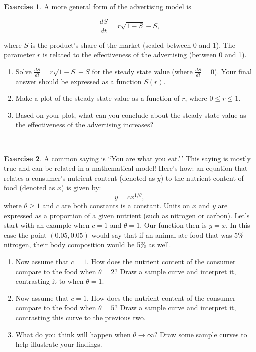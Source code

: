 \documentclass[
]{book}
\theoremstyle{definition}
\theoremstyle{definition}
\theoremstyle{definition}
\newtheorem{exercise}{Exercise}[chapter]
\theoremstyle{remark}
\begin{document}
\begin{exercise}
\protect\hypertarget{exr:unnamed-chunk-7}{}{\label{exr:unnamed-chunk-7} }A more general form of the advertising model is

\begin{equation}
\frac{dS}{dt} = r\sqrt{1-S}-S,
\end{equation}

where \(S\) is the product's share of the market (scaled between 0 and 1). The parameter \(r\) is related to the effectiveness of the advertising (between 0 and 1).

\begin{enumerate}[label=\alph*.]
  \item Solve $\displaystyle \frac{dS}{dt} = r\sqrt{1-S}-S$ for the steady state value (where $\displaystyle \frac{dS}{dt}=0$).  Your final answer should be expressed as a function $S(r)$.
  \item Make a plot of the steady state value as a function of $r$, where $0 \leq r \leq 1$.
  \item Based on your plot, what can you conclude about the steady state value as the effectiveness of the advertising increases?
  \end{enumerate}
\end{exercise}

~

\begin{exercise}
\protect\hypertarget{exr:unnamed-chunk-8}{}{\label{exr:unnamed-chunk-8} }A common saying is ``You are what you eat.'\,' This saying is mostly true and can be related in a mathematical model! Here's how: an equation that relates a consumer's nutrient content (denoted as \(y\)) to the nutrient content of food (denoted as \(x\)) is given by:
\begin{equation}
 y = c x^{1/\theta},
\end{equation}
where \(\theta \geq 1\) and \(c\) are both constants is a constant. Units on \(x\) and \(y\) are expressed as a proportion of a given nutrient (such as nitrogen or carbon). Let's start with an example when \(c=1\) and \(\theta = 1\). Our function then is \(y=x\). In this case the point \((0.05,0.05)\) would say that if an animal ate food that was 5\% nitrogen, their body composition would be 5\% as well.

\begin{enumerate}[label=\alph*.]
\item  Now assume that $c=1$. How does the nutrient content of the consumer compare to the food when $\theta=2$?  Draw a sample curve and interpret it, contrasting it to when $\theta = 1$.
\item Now assume that $c=1$. How does the nutrient content of the consumer compare to the food when $\theta=5$?  Draw a sample curve and interpret it, contrasting this curve to the previous two.
\item What do you think will happen when $\theta \rightarrow \infty$? Draw some sample curves to help illustrate your findings.
\end{enumerate}
\end{exercise}
\end{document}

